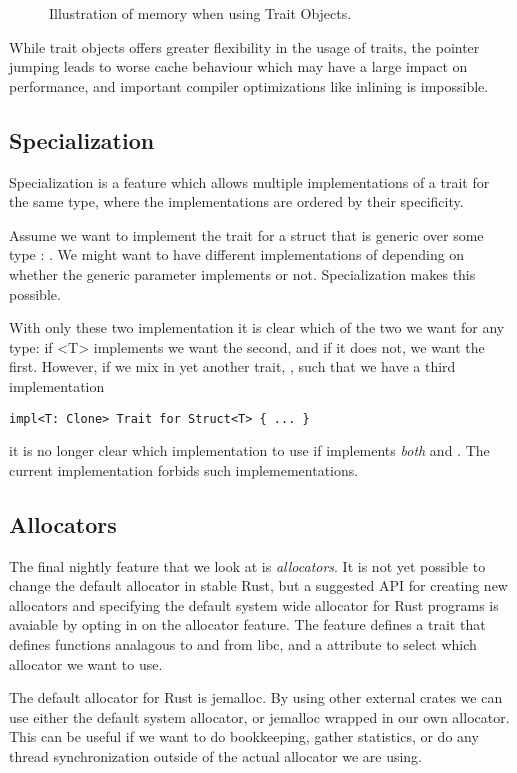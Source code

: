\begin{figure}[ht]
  \centering
  
  \caption{Illustration of memory when using Trait Objects.\label{fig:trait-objects}}
\end{figure}

While trait objects offers greater flexibility in the usage of traits, the pointer jumping leads to
worse cache behaviour which may have a large impact on performance, and important compiler
optimizations like inlining is impossible.



\subsection{Specialization\label{sec:specialization}}

Specialization is a feature which allows multiple implementations of a trait for the same type,
where the implementations are ordered by their specificity.

Assume we want to implement the trait  for a struct that is generic over some type
: . We might want to have different implementations of 
depending on whether the generic parameter  implements  or not.
Specialization makes this possible.


With only these two implementation it is clear which of the two we want for any type: if \code<T>
implements  we want the second, and if it does not, we want the first. However, if we
mix in yet another trait, , such that we have a third implementation
\begin{lstlisting}
impl<T: Clone> Trait for Struct<T> { ... }
\end{lstlisting}
it is no longer clear which implementation to use if  implements \emph{both} 
and . The current implementation forbids such implemementations.


\subsection{Allocators\label{sec:allocators}}

The final nightly feature that we look at is \emph{allocators}. It is not yet possible to change
the default allocator in stable Rust, but a suggested API for creating new allocators and
specifying the default system wide allocator for Rust programs is avaiable by opting in on the
allocator feature. The feature defines a trait  that defines functions analagous
to  and  from libc, and a attribute  to select
which allocator we want to use.

The default allocator for Rust is jemalloc\cite{jemalloc}. By using other external crates we can
use either the default system allocator, or jemalloc wrapped in our own allocator. This can be
useful if we want to do bookkeeping, gather statistics, or do any thread synchronization outside of
the actual allocator we are using.

\begin{figure}[ht]

\end{figure}
